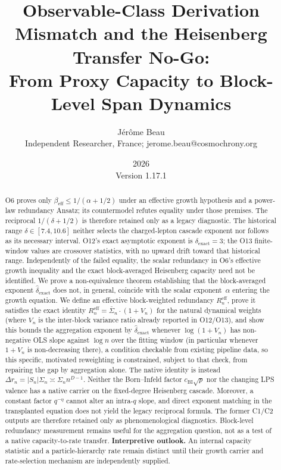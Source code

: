 \documentclass[11pt,a4paper]{article}
\title{Observable-Class Derivation Mismatch and the Heisenberg Transfer No-Go:\\
From Proxy Capacity to Block-Level Span Dynamics}
\author{J\'er\^ome Beau\\
\small Independent Researcher, France; jerome.beau@cosmochrony.org}
\date{2026\\Version 1.17.1}
\newcommand{\Sn}{\bar{\Sigma}_n}
\newcommand{\dexact}{\hat{\delta}_{\mathrm{exact}}}
\newcommand{\Reff}{R_n^{\mathrm{eff}}}
\begin{document}
\maketitle

\begin{abstract}
O6 proves only $\beta_{\mathrm{eff}}\leq1/(\alpha+1/2)$ under an effective growth
hypothesis and a power-law redundancy Ansatz; its countermodel refutes equality under those premises.
The reciprocal $1/(\delta+1/2)$ is therefore retained only as a legacy diagnostic.
The historical range $\delta\in[7.4,10.6]$ neither selects the charged-lepton cascade exponent
nor follows as its necessary interval.
O12's exact asymptotic exponent is $\delta_{\mathrm{exact}}=3$; the O13 finite-window values
are crossover statistics, with no upward drift toward that historical range.
Independently of the failed equality, the scalar redundancy in O6's effective growth inequality
and the exact block-averaged Heisenberg capacity need not be identified.
We prove a non-equivalence theorem establishing that the block-averaged
exponent $\dexact$ does not, in general, coincide with the scalar exponent~$\alpha$
entering the growth equation.
We define an effective block-weighted redundancy $\Reff$, prove it satisfies
the exact identity $\Reff=\Sn\cdot(1+V_n)$ for the natural dynamical weights
(where $V_n$ is the inter-block variance ratio already reported in O12/O13),
and show this bounds the aggregation exponent by $\dexact$ whenever
$\log(1+V_n)$ has non-negative OLS slope against $\log n$ over the fitting
window (in particular whenever $1+V_n$ is non-decreasing there), a condition
checkable from existing pipeline data, so this specific, motivated
reweighting is constrained, subject to that check, from repairing the gap by
aggregation alone.
The native identity is instead
$\Delta r_n=|S_n|\Sigma_n\asymp \Sigma_n n^{D-1}$.
Neither the Born--Infeld factor $c_{\mathrm{BI}}\sqrt{p}$ nor the changing LPS valence has a
native carrier on the fixed-degree Heisenberg cascade.
Moreover, a constant factor $q^{-\eta}$ cannot alter an intra-$q$ slope, and direct exponent
matching in the transplanted equation does not yield the legacy reciprocal formula.
The former C1/C2 outputs are therefore retained only as phenomenological diagnostics.
Block-level redundancy measurement remains useful for the aggregation question, not as a test
of a native capacity-to-rate transfer.
\textbf{Interpretive outlook.}
An internal capacity statistic and a particle-hierarchy rate remain distinct until their growth
carrier and rate-selection mechanism are independently supplied.
\end{abstract}
\end{document}
